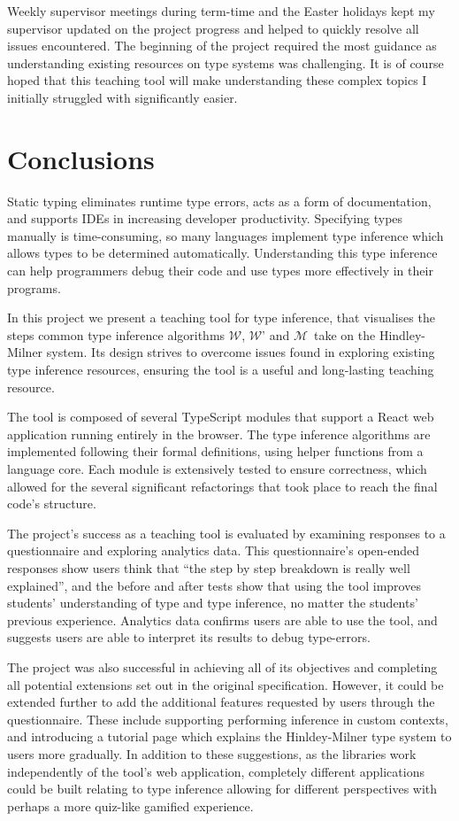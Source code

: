 \documentclass[a4paper,fleqn,oneside,12pt]{report}
\newcommand{\W}{$\mathcal{W}$}
\newcommand{\M}{$\mathcal{M}$}
\begin{document}
Weekly supervisor meetings during term-time and the Easter holidays kept my supervisor updated on the project progress and helped to quickly resolve all issues encountered. The beginning of the project required the most guidance as understanding existing resources on type systems was challenging. It is of course hoped that this teaching tool will make understanding these complex topics I initially struggled with significantly easier.

\chapter{Conclusions}\label{id:h.90axtam6qk9n}

Static typing eliminates runtime type errors, acts as a form of documentation, and supports IDEs in increasing developer productivity. Specifying types manually is time-consuming, so many languages implement type inference which allows types to be determined automatically. Understanding this type inference can help programmers debug their code and use types more effectively in their programs.

In this project we present a teaching tool for type inference, that visualises the steps common type inference algorithms \W, \W’ and \M\ take on the Hindley-Milner system. Its design strives to overcome issues found in exploring existing type inference resources, ensuring the tool is a useful and long-lasting teaching resource.

The tool is composed of several TypeScript modules that support a React web application running entirely in the browser. The type inference algorithms are implemented following their formal definitions, using helper functions from a language core. Each module is extensively tested to ensure correctness, which allowed for the several significant refactorings that took place to reach the final code's structure.

The project's success as a teaching tool is evaluated by examining responses to a questionnaire and exploring analytics data. This questionnaire’s open-ended responses show users think that “the step by step breakdown is really well explained”, and the before and after tests show that using the tool improves students' understanding of type and type inference, no matter the students' previous experience. Analytics data confirms users are able to use the tool, and suggests users are able to interpret its results to debug type-errors.

The project was also successful in achieving all of its objectives and completing all potential extensions set out in the original specification. However, it could be extended further to add the additional features requested by users through the questionnaire. These include supporting performing inference in custom contexts, and introducing a tutorial page which explains the Hinldey-Milner type system to users more gradually. In addition to these suggestions, as the libraries work independently of the tool's web application, completely different applications could be built relating to type inference allowing for different perspectives with perhaps a more quiz-like gamified experience.
\end{document}
